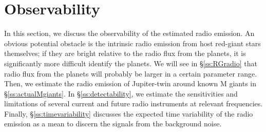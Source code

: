 \documentclass[iop,numberedappendix,apj]{emulateapj}
\def\plotonesc#1{\centering \leavevmode
\texttt{[image: \#1]}}
\begin{document}

\section{Observability}
\label{s:observability}

In this section, we discuss the observability of the estimated radio emission. 
An obvious potential obstacle is the intrinsic radio emission from host red-giant stars themselves; if they are bright relative to the radio flux from the planets, it is significantly more difficult identify the planets.
We will see in \S\ref{ss:RGradio} that radio flux from the planets will probably be larger in a certain parameter range. 
Then, we estimate the radio emission of Jupiter-twin around known M giants in \S\ref{ss:actualMgiants}. 
In \S\ref{ss:detectability}, we estimate the sensitivities and limitations of several current and future
radio instruments at relevant frequencies.
Finally, \S\ref{ss:timevariability} discusses the expected time variability of the radio emission as a mean to discern the signals from the background noise. 
\end{document}
